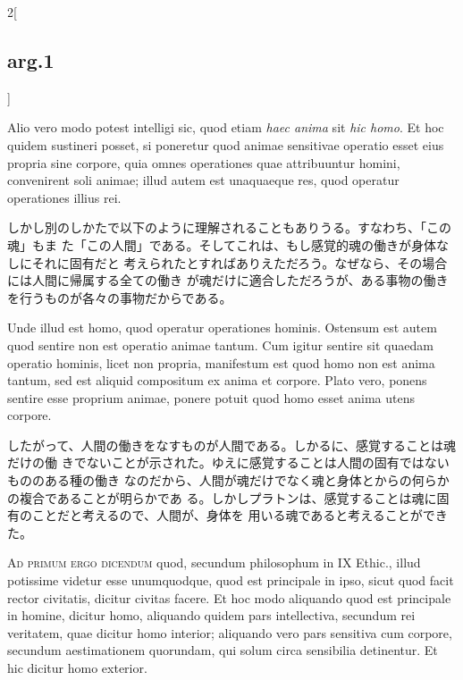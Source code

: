 \documentclass[paper=a4paper,fontsize=10pt,jafontsize=9pt,titlepage]{jlreq}
\begin{document}
\begin{paracol}{2}[\subsection{arg.1}]
\switchcolumn*

Alio vero modo potest intelligi sic, quod etiam {\itshape haec anima} sit
{\itshape hic homo}. Et hoc quidem sustineri posset, si poneretur quod animae
sensitivae operatio esset eius propria sine corpore, quia omnes operationes quae
attribuuntur homini, convenirent soli animae; illud autem est unaquaeque res,
quod operatur operationes illius rei.


\switchcolumn

しかし別のしかたで以下のように理解されることもありうる。すなわち、「この魂」もま
た「この人間」である。そしてこれは、もし感覚的魂の働きが身体なしにそれに固有だと
考えられたとすればありえただろう。なぜなら、その場合には人間に帰属する全ての働き
が魂だけに適合しただろうが、ある事物の働きを行うものが各々の事物だからである。


\switchcolumn*


Unde illud est homo, quod operatur operationes hominis. Ostensum est autem quod
sentire non est operatio animae tantum. Cum igitur sentire sit quaedam operatio
hominis, licet non propria, manifestum est quod homo non est anima tantum, sed
est aliquid compositum ex anima et corpore. Plato vero, ponens sentire esse
proprium animae, ponere potuit quod homo esset anima utens corpore.

\switchcolumn

したがって、人間の働きをなすものが人間である。しかるに、感覚することは魂だけの働
きでないことが示された。ゆえに感覚することは人間の固有ではないもののある種の働き
なのだから、人間が魂だけでなく魂と身体とからの何らかの複合であることが明らかであ
る。しかしプラトンは、感覚することは魂に固有のことだと考えるので、人間が、身体を
用いる魂であると考えることができた。

\switchcolumn*[\subsection{ad 1}]

{\scshape Ad primum ergo dicendum} quod, secundum philosophum in IX Ethic.,
illud potissime videtur esse unumquodque, quod est principale in ipso, sicut
quod facit rector civitatis, dicitur civitas facere. Et hoc modo aliquando quod
est principale in homine, dicitur homo, aliquando quidem pars intellectiva,
secundum rei veritatem, quae dicitur homo interior; aliquando vero pars
sensitiva cum corpore, secundum aestimationem quorundam, qui solum circa
sensibilia detinentur. Et hic dicitur homo exterior.


\switchcolumn


\end{paracol}
\end{document}
